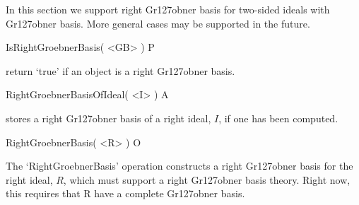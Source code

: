 \beginexample 
\endexample



In this section we support right Gr\accent127obner basis for two-sided ideals
with Gr\accent127obner basis. More general cases may be supported in the future.

\>IsRightGroebnerBasis( <GB> ) P

return `true' if an object is a right Gr\accent127obner basis.

\beginexample 
\endexample


\>RightGroebnerBasisOfIdeal( <I> ) A

stores a right Gr\accent127obner basis of a right ideal, $I$,
if one has been computed.

\>RightGroebnerBasis( <R> ) O

The `RightGroebnerBasis' operation constructs a right Gr\accent127obner basis
for the right ideal, $R$,  which must support a right Gr\accent127obner basis 
theory.  Right now, this requires that R have a complete Gr\accent127obner basis.





